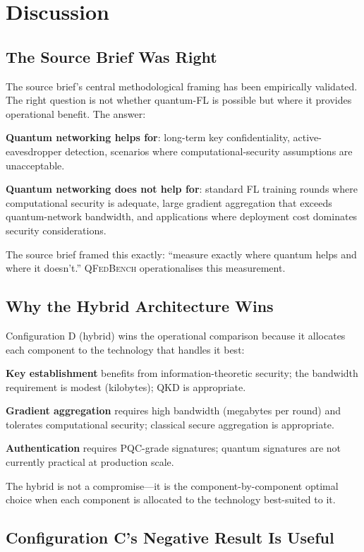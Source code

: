 \documentclass[sigconf,nonacm]{acmart}
\begin{document}
\section{Discussion}

\subsection{The Source Brief Was Right}

The source brief's central methodological framing has been
empirically validated. The right question is not whether
quantum-FL is possible but where it provides operational benefit.
The answer:

\textbf{Quantum networking helps for}: long-term key
confidentiality, active-eavesdropper detection, scenarios where
computational-security assumptions are unacceptable.

\textbf{Quantum networking does not help for}: standard FL
training rounds where computational security is adequate, large
gradient aggregation that exceeds quantum-network bandwidth, and
applications where deployment cost dominates security
considerations.

The source brief framed this exactly: ``measure exactly where
quantum helps and where it doesn't.'' \textsc{QFedBench}
operationalises this measurement.

\subsection{Why the Hybrid Architecture Wins}

Configuration D (hybrid) wins the operational comparison because
it allocates each component to the technology that handles it
best:

\textbf{Key establishment} benefits from
information-theoretic security; the bandwidth requirement is
modest (kilobytes); QKD is appropriate.

\textbf{Gradient aggregation} requires high bandwidth
(megabytes per round) and tolerates computational security;
classical secure aggregation is appropriate.

\textbf{Authentication} requires PQC-grade signatures; quantum
signatures are not currently practical at production scale.

The hybrid is not a compromise---it is the
component-by-component optimal choice when each component is
allocated to the technology best-suited to it.

\subsection{Configuration C's Negative Result Is Useful}
\end{document}
